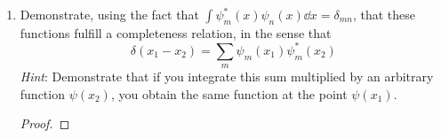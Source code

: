 \documentclass[../psets.tex]{subfiles}
\begin{document}
\begin{enumerate}
    \begin{enumerate}
        \item Demonstrate, using the fact that $\int\psi_m^*(x)\psi_n(x)\dd{x}=\delta_{mn}$, that these functions fulfill a completeness relation, in the sense that
        \begin{equation}\label{eqn:4.8}
            \delta(x_1-x_2) = \sum_m\psi_m(x_1)\psi_m^*(x_2)
        \end{equation}
        \emph{Hint}: Demonstrate that if you integrate this sum multiplied by an arbitrary function $\psi(x_2)$, you obtain the same function at the point $\psi(x_1)$.
        \begin{proof}


\end{proof}
\end{enumerate}
\end{enumerate}
\end{document}
